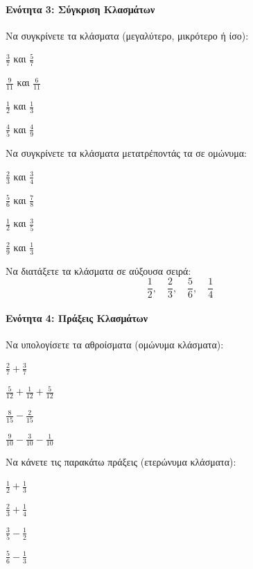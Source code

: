 \documentclass[11pt,a4paper,modern]{FFExercises}
\begin{document}
\paragraph{Ενότητα 3: Σύγκριση Κλασμάτων}

    \askhsh Να συγκρίνετε τα κλάσματα (μεγαλύτερο, μικρότερο ή ίσο):
    \begin{alist}
        \item $\frac{3}{7}$ και $\frac{5}{7}$
        \item $\frac{9}{11}$ και $\frac{6}{11}$
        \item $\frac{1}{2}$ και $\frac{1}{3}$
        \item $\frac{4}{5}$ και $\frac{4}{9}$
    \end{alist}

    \askhsh Να συγκρίνετε τα κλάσματα μετατρέποντάς τα σε ομώνυμα:
    \begin{alist}
        \item $\frac{2}{3}$ και $\frac{3}{4}$
        \item $\frac{5}{6}$ και $\frac{7}{8}$
        \item $\frac{1}{2}$ και $\frac{3}{5}$
        \item $\frac{2}{9}$ και $\frac{1}{3}$
    \end{alist}

    \askhsh Να διατάξετε τα κλάσματα σε αύξουσα σειρά:
    \[ \frac{1}{2}, \quad \frac{2}{3}, \quad \frac{5}{6}, \quad \frac{1}{4} \]

\paragraph{Ενότητα 4: Πράξεις Κλασμάτων}

    \askhsh Να υπολογίσετε τα αθροίσματα (ομώνυμα κλάσματα):
    \begin{alist}
        \item $\frac{2}{7} + \frac{3}{7}$
        \item $\frac{5}{12} + \frac{1}{12} + \frac{5}{12}$
        \item $\frac{8}{15} - \frac{2}{15}$
        \item $\frac{9}{10} - \frac{3}{10} - \frac{1}{10}$
    \end{alist}

    \askhsh Να κάνετε τις παρακάτω πράξεις (ετερώνυμα κλάσματα):
    \begin{alist}
        \item $\frac{1}{2} + \frac{1}{3}$
        \item $\frac{2}{3} + \frac{1}{4}$
        \item $\frac{3}{5} - \frac{1}{2}$
        \item $\frac{5}{6} - \frac{1}{3}$
    \end{alist}
\end{document}
